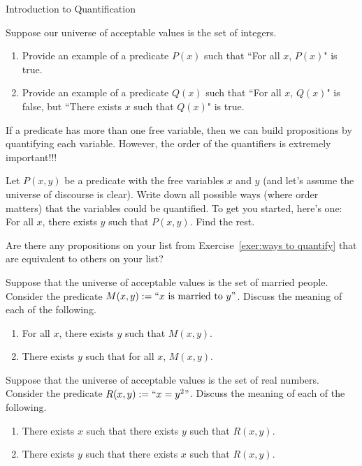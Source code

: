 \begin{section}{Introduction to Quantification}
\begin{exercise}
Suppose our universe of acceptable values is the set of integers.
\begin{enumerate}
\item Provide an example of a predicate $P(x)$ such that ``For all $x$, $P(x)$" is true.
\item Provide an example of a predicate $Q(x)$ such that ``For all $x$, $Q(x)$" is false, but ``There exists $x$ such that $Q(x)$" is true.
\end{enumerate}
\end{exercise}

If a predicate has more than one free variable, then we can build propositions by quantifying each variable.  However, the order of the quantifiers is extremely important!!!

\begin{exercise}\label{exer:ways to quantify}
Let $P(x,y)$ be a predicate with the free variables $x$ and $y$ (and let's assume the universe of discourse is clear).  Write down all possible ways (where order matters) that the variables could be quantified.  To get you started, here's one: For all $x$, there exists $y$ such that $P(x,y)$.  Find the rest.
\end{exercise}

\begin{problem}
Are there any propositions on your list from Exercise~\ref{exer:ways to quantify} that are equivalent to others on your list?  
\end{problem}

\begin{exercise}
Suppose that the universe of acceptable values is the set of married people.  Consider the predicate $M(x,y):=``x\mbox{ is married to }y"$.  Discuss the meaning of each of the following.
\begin{enumerate}
\item For all $x$, there exists $y$ such that $M(x,y)$.
\item There exists $y$ such that for all $x$, $M(x,y)$.
\end{enumerate}
\end{exercise}

\begin{exercise}
Suppose that the universe of acceptable values is the set of real numbers.  Consider the predicate $R(x,y):=``x=y^2"$.  Discuss the meaning of each of the following.
\begin{enumerate}
\item There exists $x$ such that there exists $y$ such that $R(x,y)$.
\item There exists $y$ such that there exists $x$ such that $R(x,y)$.
\end{enumerate}
\end{exercise}


\end{section}
